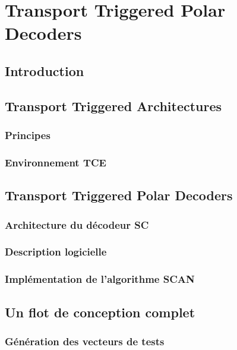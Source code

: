 \chapter{Transport Triggered Polar Decoders} %


\vspace*{\fill}
\minitocTITI
\vspace*{\fill}
\newpage

\section*{Introduction}

\section{Transport Triggered Architectures}
\subsection{Principes}
\subsection{Environnement TCE}

\section{Transport Triggered Polar Decoders}

\subsection{Architecture du décodeur SC}
\subsection{Description logicielle}
\subsection{Implémentation de l'algorithme SCAN}

\section{Un flot de conception complet}

\subsection{Génération des vecteurs de tests}
